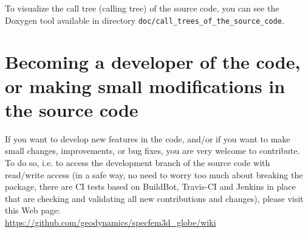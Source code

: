 To visualize the call tree (calling tree) of the source code, you can see the Doxygen tool available in directory \texttt{doc/call\_trees\_of\_the\_source\_code}.

\section{Becoming a developer of the code, or making small modifications in the source code}

If you want to develop new features in the code, and/or if you want to make small changes, improvements, or bug fixes, you are very welcome to contribute. To do so, i.e. to access the development branch of the source code with read/write access (in a safe way, no need to worry too much about breaking the package, there are CI tests based on BuildBot, Travis-CI and Jenkins in place that are checking and validating all new contributions and changes), please visit this Web page:\\
\url{https://github.com/geodynamics/specfem3d_globe/wiki}

